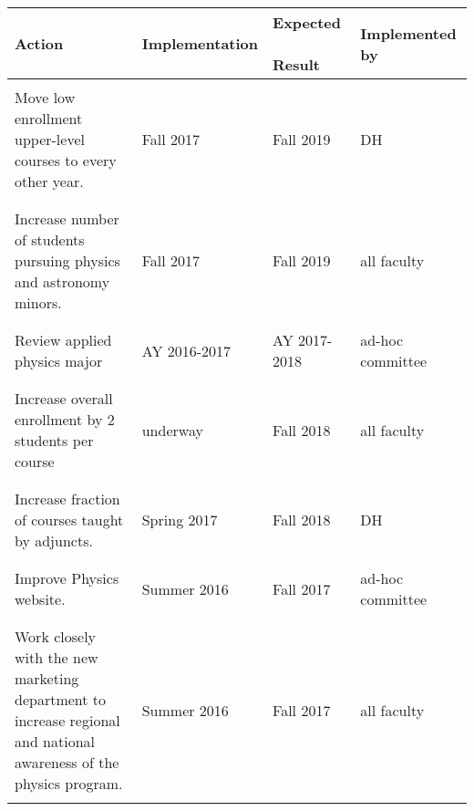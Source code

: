 \documentclass[12pt]{article}
\begin{document}
\begin{table}[h]
\begin{tabular}{|p{2.5in}|p{1.25in}|p{1.25in}|p{1in}|}
\hline
{\bf Action} & {\bf Implementation} & {\bf Expected ~~~ Result}  & {\bf Implemented by}\\
\hline \hline
 & & & \\ 
Move low enrollment upper-level courses to every other year. & Fall 2017 & Fall 2019 & DH\\ &  & &  \\ \hline
 & & & \\
Increase number of students pursuing physics and astronomy minors. & Fall 2017 & Fall 2019 & all faculty\\ &  & &  \\ \hline
 & & & \\ 
Review applied physics major & AY 2016-2017 & AY 2017-2018 & ad-hoc ~~~~ committee\\  & & & \\ \hline
 & &  &\\ 
Increase overall enrollment by 2 students per course &underway & Fall 2018 & all faculty \\ & & & \\ \hline

 & &  &\\ 
Increase fraction of courses taught by adjuncts. & Spring 2017 & Fall 2018 & DH \\
 & & & \\  \hline

& & & \\ 
Improve Physics website. & Summer 2016 & Fall 2017 & ad-hoc ~~~~ committee \\
 & & & \\  \hline

& &  & \\ Work closely with the new marketing department  to increase regional and national awareness of the physics program.& Summer 2016 & Fall 2017 & all faculty \\
 & & & \\  \hline
\hline
\end{tabular}
\end{table}
\end{document}
